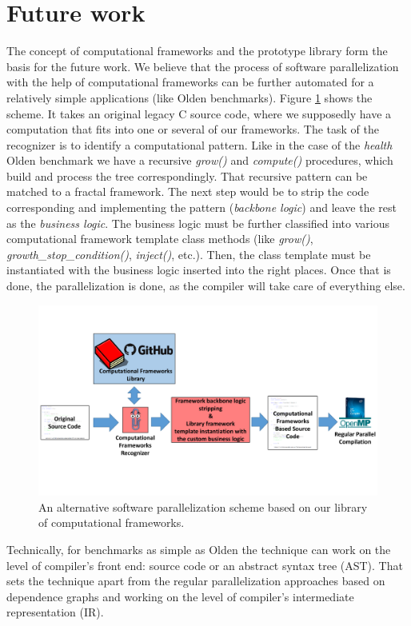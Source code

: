 \section{Future work}
\label{frameworks_future_work}
\quad The concept of computational frameworks and the prototype library form the basis for the future work. We believe that the process of software parallelization with the help of computational frameworks can be further automated for a relatively simple applications (like Olden benchmarks). Figure \ref{fig:parallelization_scheme} shows the scheme. It takes an original legacy C source code, where we supposedly have a computation that fits into one or several of our frameworks. The task of the recognizer is to identify a computational pattern. Like in the case of the \textit{health} Olden benchmark we have a recursive \textit{grow()} and \textit{compute()} procedures, which build and process the tree correspondingly. That recursive pattern can be matched to a fractal framework. The next step would be to strip the code corresponding and implementing the pattern (\textit{backbone logic}) and leave the rest as the \textit{business logic}. The business logic must be further classified into various computational framework template class methods (like \textit{grow()}, \textit{growth\_stop\_condition()}, \textit{inject()}, etc.). Then, the class template must be instantiated with the business logic inserted into the right places. Once that is done, the parallelization is done, as the compiler will take care of everything else.
\begin{figure}[!htb]
\includegraphics[width=1.0\textwidth]{images/parallelization_scheme.pdf}
\caption{An alternative software parallelization scheme based on our library of computational frameworks.}
\label{fig:parallelization_scheme}
\end{figure}\newline\null
\quad Technically, for benchmarks as simple as Olden the technique can work on the level of compiler's front end: source code or an abstract syntax tree (AST). That sets the technique apart from the regular parallelization approaches based on dependence graphs and working on the level of compiler's intermediate representation (IR).


